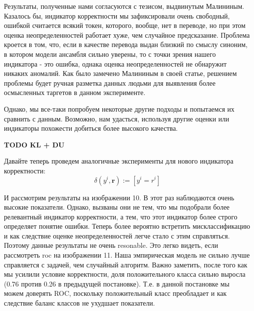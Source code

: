 \documentclass[a4paper,14pt]{extarticle}
\begin{document}
	Результаты, полученные нами согласуются с тезисом, выдвинутым Малининым. Казалось бы, индикатор корректности мы зафиксировали очень свободный, ошибкой считается всякий токен, которого, вообще, нет в переводе, но при этом оценка неопределенностей работает хуже, чем случайное предсказание. Проблема кроется в том, что, если в качестве перевода выдан близкий по смыслу синоним, в котором модели ансамбля сильно уверены, то с точки зрения нашего индикатора - это ошибка, однака оценка неопределенностей не обнаружит никаких аномалий. Как было замечено Малининым в своей статье, решением проблемы будет ручная разметка данных людьми для выявления более осмысленных таргетов в данном эксперименте.
	
	Однако, мы все-таки попробуем некоторые другие подходы и попытаемся их сравнить с данным. Возможно, нам удасться, используя другие оценки или индикаторы похожести добиться более высокого качества.
	
	\textbf{TODO KL + DU}
	
	Давайте теперь проведем аналогичные эксперименты для нового индикатора корректности:
	\begin{equation}
		\delta(y^i, \textbf{r}) := [y^i = r^i]
	\end{equation}
	
		
	\begin{figure}[t]
	\end{figure}	
	И рассмотрим результаты на изображении 10. В этот раз наблюдаются очень высокие показатели. Однако, вызваны они не тем, что мы подобрали более релевантный индикатор корректности, а тем, что этот индикатор более строго определяет понятие ошибки. Теперь более вероятно встретить мисклассификацию и как следствие оценке неопределенностей легче стало с этим справляться. Поэтому данные результаты не очень resonable. Это легко видеть, если рассмотреть roc на изображении 11. Наша эмпирическая модель не сильно лучше справляется с задачей, чем случайный алгоритм. Важно заметить, после того как мы усилили условие корректности, доля положительного класса сильно выросла (0.76 против 0.26 в предыдущей постановке). Т.е. в данной постановке мы можем доверять ROC, поскольку положительный класс преобладает и как следствие баланс классов не ухудшает показатели.
	
\end{document}
